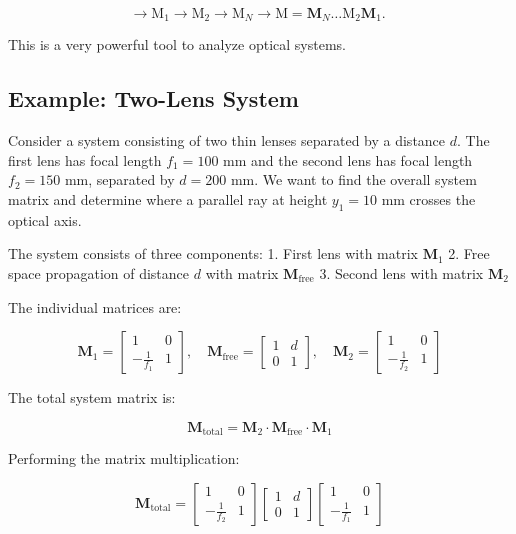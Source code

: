 \documentclass[
  a4paper,
]{book}
\begin{document}
\begin{tcolorbox}
\[
\rightarrow \mathrm{M}_1 \rightarrow \mathrm{M}_2 \rightarrow \mathrm{M}_N \rightarrow \mathrm{M}=\mathbf{M}_N \ldots \mathrm{M}_2 \mathbf{M}_1 \text {. }
\]

This is a very powerful tool to analyze optical systems.

\subsection{Example: Two-Lens System}\label{example-two-lens-system}

Consider a system consisting of two thin lenses separated by a distance
\(d\). The first lens has focal length \(f_1 = 100\) mm and the second
lens has focal length \(f_2 = 150\) mm, separated by \(d = 200\) mm. We
want to find the overall system matrix and determine where a parallel
ray at height \(y_1 = 10\) mm crosses the optical axis.

The system consists of three components: 1. First lens with matrix
\(\mathbf{M}_1\) 2. Free space propagation of distance \(d\) with matrix
\(\mathbf{M}_{\text{free}}\) 3. Second lens with matrix \(\mathbf{M}_2\)

The individual matrices are:

\[
\mathbf{M}_1 = \begin{bmatrix} 1 & 0 \\ -\frac{1}{f_1} & 1 \end{bmatrix}, \quad
\mathbf{M}_{\text{free}} = \begin{bmatrix} 1 & d \\ 0 & 1 \end{bmatrix}, \quad
\mathbf{M}_2 = \begin{bmatrix} 1 & 0 \\ -\frac{1}{f_2} & 1 \end{bmatrix}
\]

The total system matrix is:

\[
\mathbf{M}_{\text{total}} = \mathbf{M}_2 \cdot \mathbf{M}_{\text{free}} \cdot \mathbf{M}_1
\]

Performing the matrix multiplication:

\[
\mathbf{M}_{\text{total}} = \begin{bmatrix} 1 & 0 \\ -\frac{1}{f_2} & 1 \end{bmatrix} \begin{bmatrix} 1 & d \\ 0 & 1 \end{bmatrix} \begin{bmatrix} 1 & 0 \\ -\frac{1}{f_1} & 1 \end{bmatrix}
\]


\end{tcolorbox}
\end{document}
